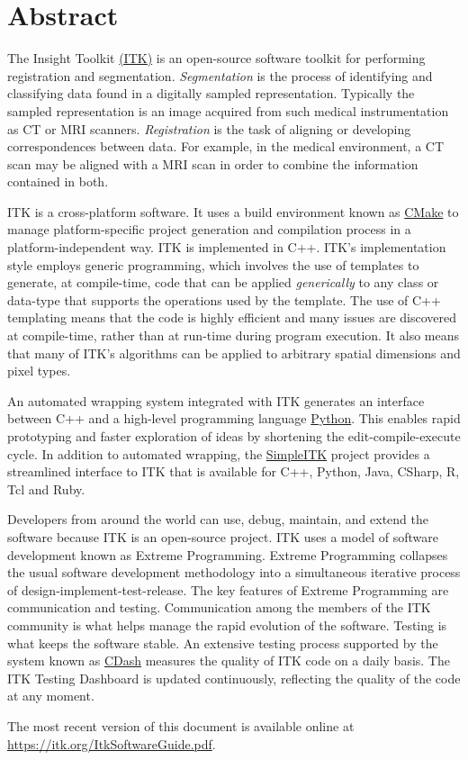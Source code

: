 \chapter*{Abstract}
\noindent
The Insight Toolkit \href{https://itk.org}{(ITK)} is an open-source
software toolkit for performing registration and
segmentation. \emph{Segmentation} is the process of identifying and
classifying data found in a digitally sampled
representation. Typically the sampled representation is an image
acquired from such medical instrumentation as CT or MRI
scanners. \emph{Registration} is the task of aligning or developing
correspondences between data. For example, in the medical environment,
a CT scan may be aligned with a MRI scan in order to combine the
information contained in both.

ITK is a cross-platform software. It uses a build environment known as
\href{https://cmake.org}{CMake} to manage platform-specific project
generation and compilation process in a platform-independent way. ITK is
implemented in C++. ITK's implementation style employs generic programming,
which involves the use of templates to generate, at compile-time, code that can
be applied \emph{generically} to any class or data-type that supports the
operations used by the template. The use of C++ templating means that the code
is highly efficient and many issues are discovered at compile-time, rather than
at run-time during program execution. It also means that many of ITK's
algorithms can be applied to arbitrary spatial dimensions and pixel types.

An automated wrapping system integrated with ITK generates an interface between
C++ and a high-level programming language \href{http://www.python.org}{Python}.
This enables rapid prototyping and faster exploration of ideas by shortening the
edit-compile-execute cycle. In addition to automated
wrapping, the \href{https://www.itk.org/Wiki/SimpleITK}{SimpleITK} project
provides a streamlined interface to ITK that is available for C++, Python, Java,
CSharp, R, Tcl and Ruby.

Developers from around the world can use, debug, maintain, and extend the
software because ITK is an open-source project. ITK uses a
model of software development known as Extreme
Programming. Extreme Programming collapses the usual software development
methodology into a simultaneous iterative process of
design-implement-test-release. The key features of Extreme Programming
are communication and testing. Communication among the members of the
ITK community is what helps manage the rapid evolution of the
software. Testing is what keeps the software stable. An
extensive testing process supported by the system known as
\href{http://open.cdash.org/index.php?project=Insight}{CDash}
measures the quality of ITK code on a daily basis. The ITK Testing Dashboard is
updated continuously, reflecting the quality of the code at any moment.

The most recent version of this document is available online at
\url{https://itk.org/ItkSoftwareGuide.pdf}.

